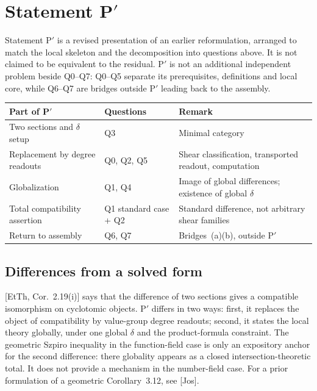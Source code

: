 \documentclass[11pt]{article}
\theoremstyle{definition}
\begin{document}
\section{Statement \texorpdfstring{P$'$}{P'}}\label{s:pprime}

Statement P$'$ is a revised presentation of an earlier
reformulation, arranged to match the local skeleton and the
decomposition into questions above.  It is not claimed to be
equivalent to the residual.  P$'$ is not an additional
independent problem beside Q0--Q7: Q0--Q5 separate its
prerequisites, definitions and local core, while Q6--Q7 are
bridges outside P$'$ leading back to the assembly.

\begin{center}
\small
\begin{tabular}{@{}p{}p{}p{}@{}}
\toprule
Part of P$'$ & Questions & Remark\\
\midrule
Two sections and $\delta$ setup & Q3 & Minimal category\\
Replacement by degree readouts & Q0, Q2, Q5 & Shear classification, transported readout, computation\\
Globalization & Q1, Q4 & Image of global differences; existence of global $\delta$\\
Total compatibility assertion & Q1 standard case + Q2 & Standard difference, not arbitrary shear families\\
Return to assembly & Q6, Q7 & Bridges~(a)(b), outside P$'$\\
\bottomrule
\end{tabular}
\end{center}

\subsection{Differences from a solved form}

[EtTh, Cor.~2.19(i)] says that the difference of two sections
gives a compatible isomorphism on cyclotomic objects.  P$'$
differs in two ways: first, it replaces the object of
compatibility by value-group degree readouts; second, it states
the local theory globally, under one global $\delta$ and the
product-formula constraint.  The geometric Szpiro inequality in
the function-field case is only an expository anchor for the
second difference: there globality appears as a closed
intersection-theoretic total.  It does not provide a mechanism
in the number-field case.  For a prior formulation of a
geometric Corollary~3.12, see [Jos].
\end{document}
